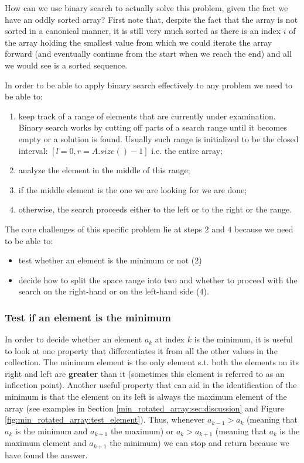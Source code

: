 How can we use binary search to actually solve this problem, given the fact we have an oddly sorted array? 
First note that,  despite the fact that the array is not sorted in a canonical manner, it is still very much sorted as there is an index $i$ of the array holding the smallest value from which we could iterate the array forward (and eventually continue from the start when we reach the end) and all we would see is a sorted sequence.

In order to be able to apply binary search effectively to any problem we need to be able to:
\begin{enumerate}
	\item keep track of a range of elements that are currently under examination. Binary search works by cutting off parts of a search range until it becomes empty or a solution is found.  Usually such range is initialized to be the closed interval: $[l=0, r=A.size()-1]$ i.e. the entire array;
	\item analyze the element in the middle of this range;
	\item if the middle element is the one we are looking for we are done;
	\item otherwise, the search proceeds either to the left or to the right or the range. 
\end{enumerate}

The core challenges of this specific problem lie at steps $2$ and $4$ because we need to be able to:
\begin{itemize}
	\item test whether an element is the minimum or not ($2$)
	\item decide how to split the space range into two and whether to proceed with the search on the right-hand or on the left-hand side ($4$).
\end{itemize}

\subsubsection{Test if an element is the minimum}

In order to decide whether an element $a_k$ at index $k$ is the minimum, it is useful to look at one property that differentiates it from all the other values in the collection.
The minimum element is the only element s.t. both the elements on its right and left are \textbf{greater} than it (sometimes this element is referred to as an inflection point). 
Another useful property that can aid in the identification of the minimum is that the element on its left is always the maximum element of the array (see examples in Section \ref{min_rotated_array:sec:discussion} and Figure \ref{fig:min_rotated_array:test_element}).
Thus, whenever $a_{k-1} > a_{k}$ (meaning that $a_k$ is the minimum and $a_{k+1}$ the maximum) or $a_{k} > a_{k+1}$ (meaning that $a_k$ is the maximum element and $a_{k+1}$ the minimum) we can stop and return because we have found the answer.

